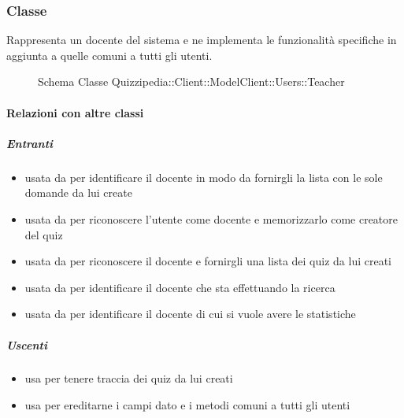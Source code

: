\subsubsection{Classe }
Rappresenta un docente del sistema e ne implementa le funzionalità specifiche in aggiunta a quelle comuni a tutti gli utenti.
\begin{figure}[H]
\centering
\noindent{}
\caption[Schema Classe Teacher]{Schema Classe Quizzipedia::Client::ModelClient::Users::Teacher}
\end{figure}
\paragraph{Relazioni con altre classi}
\subparagraph{Entranti}
\begin{itemize}
\item usata da  per identificare il docente in modo da fornirgli la lista con le sole domande da lui create
\item usata da  per riconoscere l'utente come docente e memorizzarlo come creatore del quiz
\item usata da  per riconoscere il docente e fornirgli una lista dei quiz da lui creati
\item usata da  per identificare il docente che sta effettuando la ricerca
\item usata da  per identificare il docente di cui si vuole avere le statistiche
\end{itemize}
\subparagraph{Uscenti}
\begin{itemize}
\item usa  per tenere traccia dei quiz da lui creati
\item usa  per ereditarne i campi dato e i metodi comuni a tutti gli utenti
\end{itemize}
